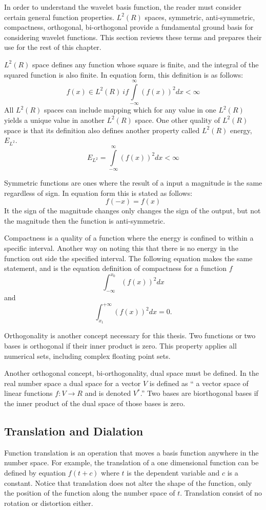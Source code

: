 In order to understand the wavelet basis function, the reader must consider certain general function properties.  $L^2(R)$ spaces, symmetric, anti-symmetric, compactness, orthogonal, bi-orthogonal provide a fundamental ground basis for considering wavelet functions.    This section reviews these terms and prepares their use for the rest of this chapter.  

$L^2(R)$ space defines any function whose square is finite, and the integral of the squared function is also finite.   In equation form, this definition is as follows:
\[ f(x) \in L^2(R) \ {if} \int\limits _{-\infty}^{\infty} (f(x))^2 dx < \infty \]
All $L^2(R)$ spaces can include mapping which for any value in one $L^2(R)$ yields a unique value in another $L^2(R)$ space.  One other quality of $L^2(R)$ space is that its definition also defines another property called $L^2(R)$ energy, $E_{L^2}$.
\[ E_{L^2}=\int\limits _{-\infty}^{\infty} (f(x))^2 dx < \infty \]

Symmetric functions are ones where the result of a input a magnitude is the same regardless of sign.  In equation form this is stated as follows:
\[
f(-x) = f(x)
\]
It the sign of the magnitude changes only changes the sign of the output, but not the magnitude then the function is anti-symmetric.  

Compactness is a quality of a function where the energy is confined to within a specific interval.  Another way on noting this that there is no energy in the function out side the specified interval.   The following equation makes the same statement, and is the equation definition of compactness for a function $f$
\[
\int_{-\infty}^{x_0} (f(x))^2 dx\] and 
\[ \int_{x_1}^{+\infty} (f(x))^2 dx = 0.
\]

Orthogonality is another concept necessary for this thesis.  Two functions or two bases is orthogonal if their inner product is zero.  This property applies all numerical sets, including complex floating point sets.  

Another orthogonal concept, bi-orthogonality, dual space must be defined.   In the real number space a dual space for a vector $V$ is defined as `` a vector space of linear functions $f:V\to R$ and is denoted $V^*$.''\cite{rowland}  Two bases are biorthogonal bases  if the inner product of the dual space of those bases is zero.  

\subsection {Translation and Dialation}
Function translation is an operation that moves a basis function anywhere in the number space.  For example, the translation of a one dimensional function can be defined by equation $f(t+c)$ where $t$ is the dependent variable and $c$ is a constant.  Notice that translation does not alter the shape of the function, only the position of the function along the number space of $t$.  Translation consist of no rotation or distortion either.\cite{translation}  

